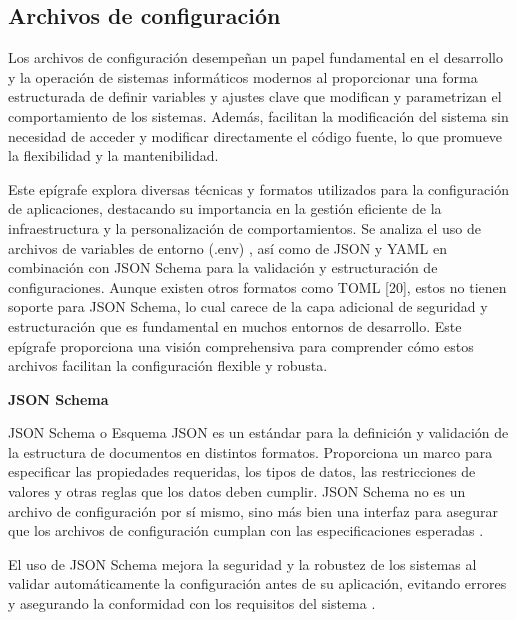 \subsection{Archivos de configuración}

Los archivos de configuración desempeñan un papel fundamental en el desarrollo y la operación de sistemas informáticos modernos al proporcionar una forma estructurada de definir variables y ajustes clave que modifican y parametrizan el comportamiento de los sistemas. Además, facilitan la modificación del sistema sin necesidad de acceder y modificar directamente el código fuente, lo que promueve la flexibilidad y la mantenibilidad.

Este epígrafe explora diversas técnicas y formatos utilizados para la configuración de aplicaciones, destacando su importancia en la gestión eficiente de la infraestructura y la personalización de comportamientos. Se analiza el uso de archivos de variables de entorno (.env) \autocite{pandey_guide_2022}, así como de JSON \autocite{erickson_what_2024,bray_javascript_2014} y YAML \autocite{ben-kiki_yaml_2021,redhat_what_2023} en combinación con JSON Schema \autocite{attouche_witness_2022,json_schema_json_2024} para la validación y estructuración de configuraciones. Aunque existen otros formatos como TOML [20], estos no tienen soporte para JSON Schema, lo cual carece de la capa adicional de seguridad y estructuración que es fundamental en muchos entornos de desarrollo. Este epígrafe proporciona una visión comprehensiva para comprender cómo estos archivos facilitan la configuración flexible y robusta.

\textbf{JSON Schema}

JSON Schema o Esquema JSON es un estándar para la definición y validación de la estructura de documentos en distintos formatos. Proporciona un marco para especificar las propiedades requeridas, los tipos de datos, las restricciones de valores y otras reglas que los datos deben cumplir. JSON Schema no es un archivo de configuración por sí mismo, sino más bien una interfaz para asegurar que los archivos de configuración cumplan con las especificaciones esperadas \autocite{attouche_witness_2022,json_schema_json_2024}.

El uso de JSON Schema mejora la seguridad y la robustez de los sistemas al validar automáticamente la configuración antes de su aplicación, evitando errores y asegurando la conformidad con los requisitos del sistema \autocite{attouche_witness_2022,json_schema_json_2024}.

